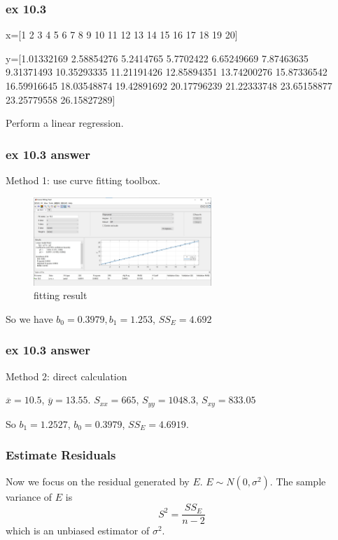 \documentclass{beamer}
\begin{document}
\begin{frame}
    \frametitle{ex 10.3}

    x=[1  2  3  4  5  6  7  8  9 10 11 12 13 14 15 16 17 18 19 20]\par
    y=[1.01332169  2.58854276  5.2414765   5.7702422   6.65249669  7.87463635
    9.31371493 10.35293335 11.21191426 12.85894351 13.74200276 15.87336542
   16.59916645 18.03548874 19.42891692 20.17796239 21.22333748 23.65158877
   23.25779558 26.15827289]\par
   Perform a linear regression.

\end{frame}

\begin{frame}
    \frametitle{ex 10.3 answer}

    Method 1: use curve fitting toolbox.\par
    \begin{figure}[H]
        \centering
        \includegraphics[width=0.6\textwidth,height=0.3\textwidth]{ex10_3_m1.jpg}
        \caption{fitting result}
    \end{figure}\par
    So we have $b_0=0.3979, b_1=1.253$, $SS_E=4.692$

\end{frame}

\begin{frame}
    \frametitle{ex 10.3 answer}

    Method 2: direct calculation\par
    $\overline{x}=10.5$, $\overline{y}=13.55$. $S_{xx}=665$, $S_{yy}=1048.3$, $S_{xy}=833.05$\par
    So $b_1=1.2527$, $b_0=0.3979$, $SS_E=4.6919$.

\end{frame}

\begin{frame}
    \frametitle{Estimate Residuals}

    Now we focus on the residual generated by $E$. $E\sim N(0,\sigma^2)$. The sample variance of $E$ is 
    \[S^2=\frac{SS_E}{n-2}\]
    which is an unbiased estimator of $\sigma^2$. \par
    

\end{frame}
\end{document}
